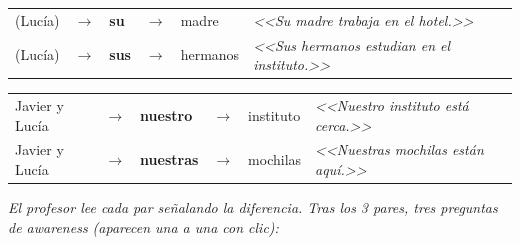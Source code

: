\documentclass[a4paper,10pt]{article}
\renewcommand{\arraystretch}{1.3}
\newcommand{\pos}[1]{\textbf{\textcolor{purpura}{#1}}}
\begin{document}
\vspace{0.3cm}

\begin{tcolorbox}[colback=white, colframe=purpura!60, title={\textbf{Par 2}}, fonttitle=\bfseries\color{purpura}, colbacktitle=purpura!10, arc=3pt, boxrule=0.8pt]
\renewcommand{\arraystretch}{1.6}
\begin{tabular}{>{\raggedleft\arraybackslash}p{3cm} c >{\centering\arraybackslash}p{1.5cm} c >{\raggedright\arraybackslash}p{3cm} p{5cm}}
(Luc\'ia) & $\rightarrow$ & \pos{su} & $\rightarrow$ & madre & \textit{<<Su madre trabaja en el hotel.>>} \\
(Luc\'ia) & $\rightarrow$ & \pos{sus} & $\rightarrow$ & hermanos & \textit{<<Sus hermanos estudian en el instituto.>>} \\
\end{tabular}
\end{tcolorbox}

\vspace{0.3cm}

\begin{tcolorbox}[colback=white, colframe=purpura!60, title={\textbf{Par 3}}, fonttitle=\bfseries\color{purpura}, colbacktitle=purpura!10, arc=3pt, boxrule=0.8pt]
\renewcommand{\arraystretch}{1.6}
\begin{tabular}{>{\raggedleft\arraybackslash}p{3cm} c >{\centering\arraybackslash}p{1.8cm} c >{\raggedright\arraybackslash}p{3cm} p{4.5cm}}
Javier y Luc\'ia & $\rightarrow$ & \pos{nuestro} & $\rightarrow$ & instituto & \textit{<<Nuestro instituto est\'a cerca.>>} \\
Javier y Luc\'ia & $\rightarrow$ & \pos{nuestras} & $\rightarrow$ & mochilas & \textit{<<Nuestras mochilas est\'an aqu\'i.>>} \\
\end{tabular}
\end{tcolorbox}

\vspace{0.5cm}

\textit{El profesor lee cada par se\~{n}alando la diferencia. Tras los 3 pares, tres preguntas de awareness (aparecen una a una con clic):}

\vspace{0.3cm}
\end{document}
